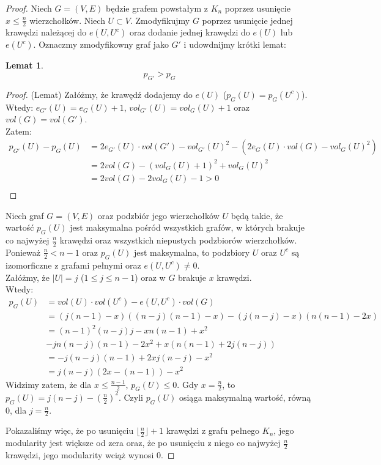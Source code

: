 \documentclass[letterpaper,12pt]{article}
\newtheorem{lemma}{Lemat}
\begin{document}
\begin{proof}
    Niech \(G = \left(V, E\right)\) będzie grafem powstałym z \(K_n\) poprzez usunięcie \(x \leq \frac{n}{2}\) wierzchołków. Niech \(U \subset V\). Zmodyfikujmy \(G\) poprzez usunięcie jednej krawędzi należącej do \(e(U, U^c)\) oraz dodanie jednej krawędzi do \(e(U)\) lub \(e(U^c)\). Oznaczmy zmodyfikowny graf jako \(G'\) i udowdnijmy krótki lemat:
      \begin{lemma}
        \[p_{G'} > p_G\]
      \end{lemma}
      \begin{proof}
        (Lemat)
        Załóżmy, że krawędź dodajemy do \(e(U)\) (\(p_G(U) = p_G(U^c)\)). Wtedy:
        \(e_{G'}(U) = e_G(U)+1\), \(vol_{G'}(U) = vol_G(U) + 1\) oraz \(vol(G) = vol(G')\).\\
        Zatem:
        \begin{align*}
          p_{G'}(U) - p_G(U) &= 2e_{G'}(U) \cdot vol(G') - vol_{G'}(U)^2 - \left(2e_{G}(U) \cdot vol(G) - vol_{G}(U)^2\right) \\
          &= 2vol(G) - (vol_G(U)+1)^2 + vol_G(U)^2 \\
          &= 2vol(G) - 2vol_G(U) - 1 > 0 \\
        \end{align*}
      \end{proof}
      Niech graf \(G = (V, E)\) oraz podzbiór jego wierzchołków \(U\) będą takie, że wartość \(p_G(U)\) jest maksymalna pośród wszystkich grafów, w których brakuje co najwyżej \(\frac{n}{2}\) krawędzi oraz wszystkich niepustych podzbiorów wierzchołków. Ponieważ \(\frac{n}{2} < n-1\) oraz \(p_G(U)\) jest maksymalna, to podzbiory \(U\) oraz \(U^c\) są izomorficzne z grafami pełnymi oraz \(e(U, U^c) \neq 0\).\\

      Załóżmy, że \(|U| = j\) (\(1 \leq j \leq n-1\)) oraz w \(G\) brakuje \(x\) krawędzi.\\
      Wtedy:
      \begin{align*}
        p_G(U) &= vol(U) \cdot vol(U^c) - e(U, U^c) \cdot vol(G) \\
        &= (j(n-1) - x)((n-j)(n-1) - x) - (j(n-j) - x)(n(n-1) - 2x)\\
        &= (n-1)^2(n-j)j-xn(n-1)+x^2\\
        &- jn(n-j)(n-1)-2x^2+x(n(n-1)+2j(n-j))\\
        &= -j(n-j)(n-1) + 2xj(n-j) - x^2\\
        &= j(n-j)(2x-(n-1)) - x^2
      \end{align*}
      Widzimy zatem, że dla \(x \leq \frac{n-1}{2}\), \(p_G(U) \leq 0\). Gdy \(x = \frac{n}{2}\), to \(p_G(U) = j(n-j)-(\frac{n}{2})^2\). Czyli \(p_G(U)\) osiąga maksymalną wartość, równą \(0\), dla \(j = \frac{n}{2}\).

      Pokazaliśmy więc, że po usunięciu \(\lfloor\frac{n}{2}\rfloor + 1\) krawędzi z grafu pełnego \(K_n\), jego modularity jest większe od zera oraz, że po usunięciu z niego co najwyżej \(\frac{n}{2}\) krawędzi, jego modularity wciąż wynosi 0.
  \end{proof}
\end{document}
